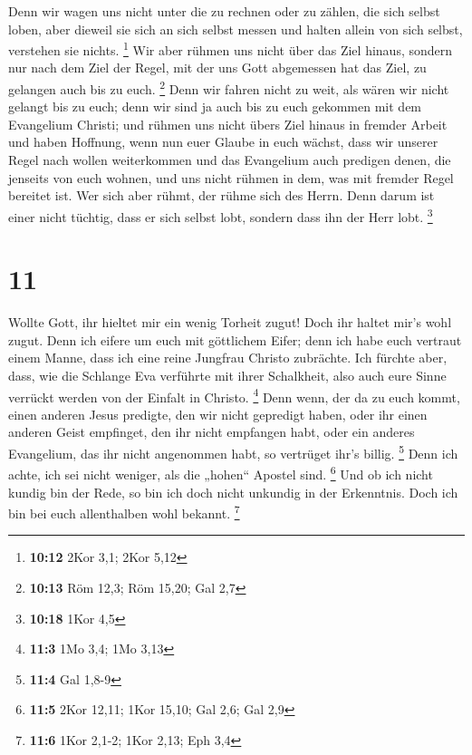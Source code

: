  Denn wir wagen uns nicht unter die zu rechnen oder zu
zählen, die sich selbst loben, aber dieweil sie sich an sich selbst
messen und halten allein von sich selbst, verstehen sie nichts.
\footnote{\textbf{10:12} 2Kor 3,1; 2Kor 5,12}  Wir aber
rühmen uns nicht über das Ziel hinaus, sondern nur nach dem Ziel der
Regel, mit der uns Gott abgemessen hat das Ziel, zu gelangen auch bis zu
euch. \footnote{\textbf{10:13} Röm 12,3; Röm 15,20; Gal 2,7}
 Denn wir fahren nicht zu weit, als wären wir nicht
gelangt bis zu euch; denn wir sind ja auch bis zu euch gekommen mit dem
Evangelium Christi;  und rühmen uns nicht übers Ziel
hinaus in fremder Arbeit und haben Hoffnung, wenn nun euer Glaube in
euch wächst, dass wir unserer Regel nach wollen weiterkommen
 und das Evangelium auch predigen denen, die jenseits von
euch wohnen, und uns nicht rühmen in dem, was mit fremder Regel bereitet
ist.  Wer sich aber rühmt, der rühme sich des Herrn.
 Denn darum ist einer nicht tüchtig, dass er sich selbst
lobt, sondern dass ihn der Herr lobt. \footnote{\textbf{10:18} 1Kor 4,5}

\hypertarget{section-5}{%
\section{11}\label{section-5}}

 Wollte Gott, ihr hieltet mir ein wenig Torheit zugut!
Doch ihr haltet mir's wohl zugut.  Denn ich eifere um euch
mit göttlichem Eifer; denn ich habe euch vertraut einem Manne, dass ich
eine reine Jungfrau Christo zubrächte.  Ich fürchte aber,
dass, wie die Schlange Eva verführte mit ihrer Schalkheit, also auch
eure Sinne verrückt werden von der Einfalt in Christo. \footnote{\textbf{11:3}
  1Mo 3,4; 1Mo 3,13}  Denn wenn, der da zu euch kommt,
einen anderen Jesus predigte, den wir nicht gepredigt haben, oder ihr
einen anderen Geist empfinget, den ihr nicht empfangen habt, oder ein
anderes Evangelium, das ihr nicht angenommen habt, so vertrüget ihr's
billig. \footnote{\textbf{11:4} Gal 1,8-9}  Denn ich
achte, ich sei nicht weniger, als die „hohen`` Apostel sind. \footnote{\textbf{11:5}
  2Kor 12,11; 1Kor 15,10; Gal 2,6; Gal 2,9}  Und ob ich
nicht kundig bin der Rede, so bin ich doch nicht unkundig in der
Erkenntnis. Doch ich bin bei euch allenthalben wohl bekannt. \footnote{\textbf{11:6}
  1Kor 2,1-2; 1Kor 2,13; Eph 3,4}

